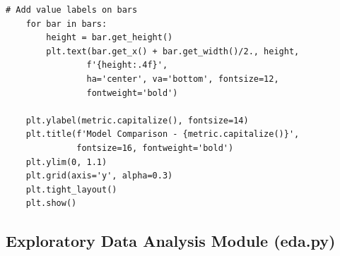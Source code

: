 \documentclass[man,12pt,letterpaper,donotrepeattitle,floatsintext]{apa7}
\begin{document}
\begin{lstlisting}[style=pythonstyle]
    # Add value labels on bars
    for bar in bars:
        height = bar.get_height()
        plt.text(bar.get_x() + bar.get_width()/2., height,
                f'{height:.4f}',
                ha='center', va='bottom', fontsize=12, 
                fontweight='bold')
    
    plt.ylabel(metric.capitalize(), fontsize=14)
    plt.title(f'Model Comparison - {metric.capitalize()}', 
              fontsize=16, fontweight='bold')
    plt.ylim(0, 1.1)
    plt.grid(axis='y', alpha=0.3)
    plt.tight_layout()
    plt.show()
\end{lstlisting}

\subsection{Exploratory Data Analysis Module (eda.py)}
\end{document}
